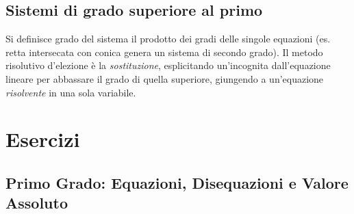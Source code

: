 \subsection{Sistemi di grado superiore al primo}
Si definisce grado del sistema il prodotto dei gradi delle singole equazioni (es. retta intersecata con conica genera un sistema di secondo grado). Il metodo risolutivo d'elezione è la \textit{sostituzione}, esplicitando un'incognita dall'equazione lineare per abbassare il grado di quella superiore, giungendo a un'equazione \textit{risolvente} in una sola variabile.

\section{Esercizi}

\subsection{Primo Grado: Equazioni, Disequazioni e Valore Assoluto}
